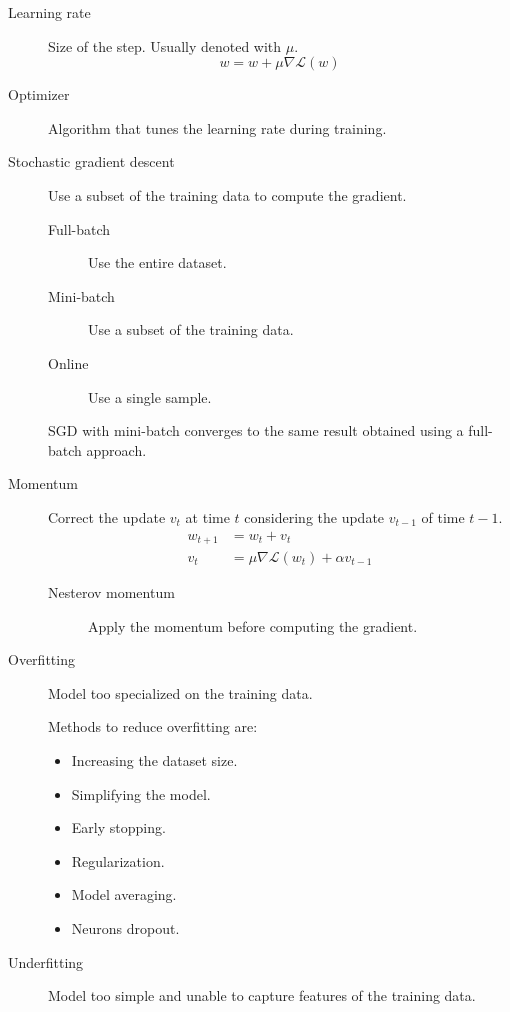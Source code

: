 \begin{description}
    \item[Learning rate] 
        Size of the step. Usually denoted with $\mu$.
        \[ w = w + \mu \nabla \mathcal{L}(w) \]

    \item[Optimizer] 
        Algorithm that tunes the learning rate during training.

    \item[Stochastic gradient descent] 
        Use a subset of the training data to compute the gradient.
        \begin{description}
            \item[Full-batch] Use the entire dataset.
            \item[Mini-batch] Use a subset of the training data.
            \item[Online] Use a single sample.
        \end{description}

        \begin{remark}
            SGD with mini-batch converges to the same result obtained using a full-batch approach.
        \end{remark}

    \item[Momentum] 
        Correct the update $v_t$ at time $t$ considering the update $v_{t-1}$ of time $t-1$.
        \[ 
            \begin{split}
                w_{t+1} &= w_t + v_t\\
                v_t &= \mu \nabla \mathcal{L}(w_t) + \alpha v_{t-1} 
            \end{split}    
        \]

        \begin{description}
            \item[Nesterov momentum] 
                Apply the momentum before computing the gradient.
        \end{description}


    \item[Overfitting] 
        Model too specialized on the training data.

        Methods to reduce overfitting are:
        \begin{itemize}
            \item Increasing the dataset size.
            \item Simplifying the model.
            \item Early stopping.
            \item Regularization.
            \item Model averaging.
            \item Neurons dropout.
        \end{itemize}

    \item[Underfitting] 
        Model too simple and unable to capture features of the training data.
\end{description}
